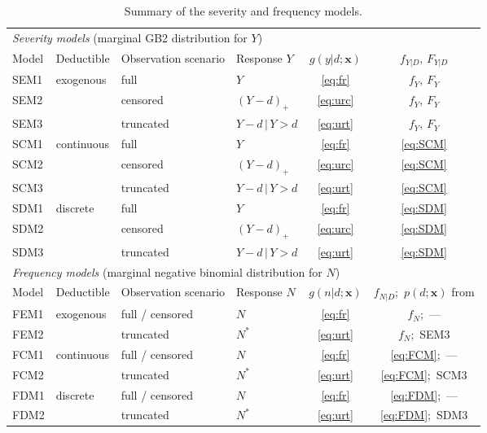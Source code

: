 \documentclass[11pt]{article}
\newcommand{\authnote}[1]{{\color{red}[\textbf{Note to authors:} #1]}}
\begin{document}
\begin{table}[!ht]
\centering
\small
\renewcommand{\arraystretch}{1.15}
\begin{tabular}{llllcc}
\toprule
\multicolumn{6}{l}{\textit{Severity models} (marginal GB2 distribution for $Y$)}\\
Model & Deductible & Observation scenario & Response $Y$ & $g(y|d;\bm{x})$ & $f_{Y|D},\,F_{Y|D}$ \\
\midrule
SEM1 & \multirow{3}{*}{exogenous}  & full & $Y$ & \eqref{eq:fr}  & $f_{Y},\,F_{Y}$ \\
SEM2 &   & censored  & $(Y-d)_+$ & \eqref{eq:urc} & $f_{Y},\,F_{Y}$ \\
SEM3 &   & truncated & $Y-d\,|\,Y>d$ & \eqref{eq:urt} & $f_{Y},\,F_{Y}$ \\
\midrule
SCM1 & \multirow{3}{*}{continuous} & full & $Y$ & \eqref{eq:fr}  & \eqref{eq:SCM} \\
SCM2 &  & censored  & $(Y-d)_+$           & \eqref{eq:urc} & \eqref{eq:SCM} \\
SCM3 &  & truncated & $Y-d\,|\,Y>d$     & \eqref{eq:urt} & \eqref{eq:SCM} \\
\midrule
SDM1 & \multirow{3}{*}{discrete}   & full      & $Y$ & \eqref{eq:fr}  & \eqref{eq:SDM} \\
SDM2 &    & censored  & $(Y-d)_+$           & \eqref{eq:urc} & \eqref{eq:SDM} \\
SDM3 &    & truncated & $Y-d\,|\,Y>d$     & \eqref{eq:urt} & \eqref{eq:SDM} \\
\midrule
\multicolumn{6}{l}{\textit{Frequency models} (marginal negative binomial distribution for $N$)}\\
Model & Deductible & Observation scenario & Response $N$ & $g(n|d;\bm{x})$ & $f_{N|D}$;\ $p(d;\bm{x})$ from \\
\midrule
FEM1 & \multirow{2}{*}{exogenous}  & full / censored & $N$ & \eqref{eq:fr}  & $f_{N}$;\ --- \\
FEM2 &   & truncated       & $N^*$    & \eqref{eq:urt} & $f_{N}$;\ SEM3 \\
\midrule
FCM1 & \multirow{2}{*}{continuous} & full / censored & $N$ & \eqref{eq:fr}  & \eqref{eq:FCM};\ --- \\
FCM2 &  & truncated       & $N^*$    & \eqref{eq:urt} & \eqref{eq:FCM};\ SCM3 \\
\midrule
FDM1 & \multirow{2}{*}{discrete}   & full / censored & $N$ & \eqref{eq:fr}  & \eqref{eq:FDM};\ --- \\
FDM2 &    & truncated       & $N^*$  & \eqref{eq:urt} & \eqref{eq:FDM};\ SDM3 \\
\bottomrule
\end{tabular}
\caption{{Summary of the severity and frequency models.}}
\label{tab:modelsummary}
\end{table}
\end{document}
